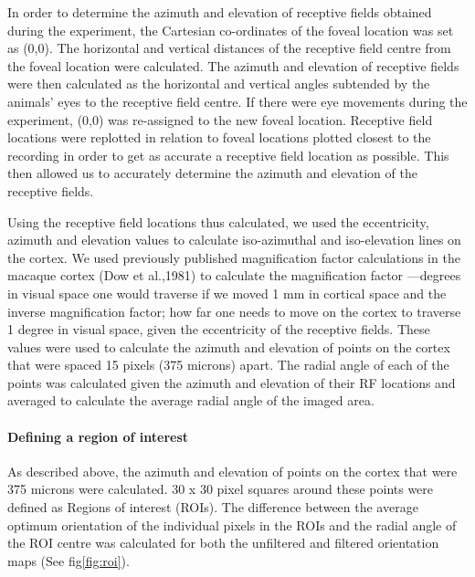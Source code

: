 		In order to determine the azimuth and elevation of receptive fields obtained during the experiment, the Cartesian co-ordinates of the foveal location was set as (0,0). The horizontal and vertical distances of the receptive field centre from the foveal location were calculated. The azimuth and elevation of receptive fields were then calculated as the horizontal and vertical angles subtended by the animals’ eyes to the receptive field centre. If there were eye movements during the experiment, (0,0) was re-assigned to the new foveal location. Receptive field locations were replotted in relation to foveal locations plotted closest to the recording in order to get as accurate a receptive field location as possible. This then allowed us to accurately determine the azimuth and elevation of the receptive fields.
		
		Using the receptive field locations thus calculated, we used the eccentricity, azimuth and elevation values to calculate iso-azimuthal and iso-elevation lines on the cortex. We used previously published magnification factor calculations in the macaque cortex (Dow et al.,1981) to calculate the magnification factor —degrees in visual space one would traverse if we moved 1 mm in cortical space and the inverse magnification factor; how far one needs to move on the cortex to traverse 1 degree in visual space, given the eccentricity of the receptive fields. These values were used to calculate the azimuth and elevation of points on the cortex that were spaced 15 pixels (375 microns) apart. The radial angle of each of the points was calculated given the azimuth and elevation of their RF locations and averaged to calculate the average radial angle of the imaged area.
		
		\paragraph{Defining a region of interest}
		As described above, the azimuth and elevation of points on the cortex that were 375 microns were calculated. 30 x 30 pixel squares around these points were defined as Regions of interest (ROIs). The difference between the average optimum orientation of the individual pixels in the ROIs and the radial angle of the ROI centre was calculated for both the unfiltered and filtered orientation maps (See fig\ref{fig:roi}).
		
